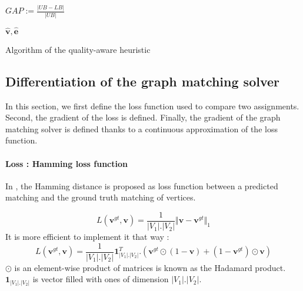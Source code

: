 \documentclass[times,onecolumn,final,authoryear]{article}
\theoremstyle{definition}
\begin{document}
\begin{algorithm}
{    
    

    

    $GAP:=\frac{|UB-LB|}{|UB|}$
 }
\Return $\hat{\textbf{v}},\hat{\textbf{e}}$ 
 \caption{Algorithm of the quality-aware heuristic}
\end{algorithm}


\subsection{Differentiation of the graph matching solver}
In this section, we first define the loss function used to compare two assignments. Second, the gradient of the loss is defined. Finally, the gradient of the graph matching solver is defined thanks to a continuous approximation of the loss function.
\paragraph{Loss : Hamming loss function}
In \cite{BB-GM}, the Hamming distance is proposed as loss function between a predicted matching and the ground truth matching of vertices.

\begin{equation}
L( \textbf{v}^{gt}, \textbf{v})= \frac{1}{|V_1|.|V_2| } \Vert \textbf{v}- \textbf{v}^{gt} \Vert_1
\end{equation}
It is more efficient to implement it that way : 
\begin{equation}
L( \textbf{v}^{gt}, \textbf{v})=\frac{1}{|V_1|.|V_2| } \mathbf{1}_{|V_1|.|V_2|}^{T} . (\textbf{v}^{gt}\odot(1-\textbf{v})+(1-\textbf{v}^{gt})\odot\textbf{v})
\end{equation}
$\odot$ is an element-wise product of matrices is known as the Hadamard product. $\mathbf{1}_{|V_1|.|V_2|}$ is vector filled with ones of dimension $|V_1|.|V_2|$.
\end{document}
